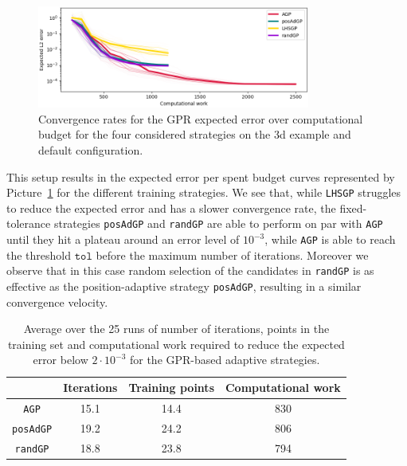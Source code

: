 \begin{figure}[H]
\begin{center}
    \includegraphics[width=0.8\textwidth]{results/pictures/d3/GP_res.png}
\end{center}
\caption{Convergence rates for the GPR expected error over computational budget for the four considered strategies on the 3d example and default configuration.}
\label{fig:3dGPconv}
\end{figure}

This setup results in the expected error per spent budget curves represented by Picture~\ref{fig:3dGPconv} for the different training strategies.
We see that, while \texttt{LHSGP} struggles to reduce the expected error and has a slower convergence rate, the fixed-tolerance strategies \texttt{posAdGP} and \texttt{randGP} are able to perform on par with \texttt{AGP} until they hit a plateau around an error level of $10^{-3}$, while \texttt{AGP} is able to reach the threshold $\texttt{tol}$ before the maximum number of iterations.
Moreover we observe that in this case random selection of the candidates in \texttt{randGP} is as effective as the position-adaptive strategy \texttt{posAdGP}, resulting in a similar convergence velocity.

\begin{table}[H]
    \centering
    \begin{tabular}{cccc}
    \toprule
         & Iterations & Training points & Computational work \\
         \midrule
         \texttt{AGP} 
         & 15.1 & 14.4 & 830 \\
         \texttt{posAdGP} 
         & 19.2 & 24.2 & 806 \\
         \texttt{randGP} 
         & 18.8 & 23.8 & 794  \\
         \bottomrule
    \end{tabular}
    \caption{Average over the 25 runs of number of iterations, points in the training set and computational work required to reduce the expected error below $2 \cdot 10^{-3}$ for the GPR-based adaptive strategies.}
    \label{tab:3dGP-plateau}
\end{table}

